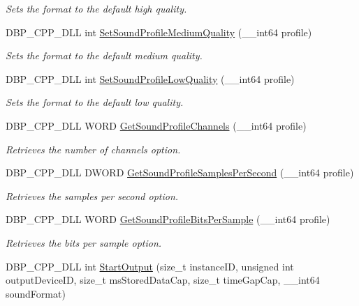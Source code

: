 \begin{DoxyCompactItemize}
\begin{DoxyCompactList}\small\item\em Sets the format to the default high quality. \item\end{DoxyCompactList}\item 
DBP\_\-CPP\_\-DLL int \hyperlink{namespacemn_sound_a3551bc3ffd8d9b55fd7e2edbfc83652a}{SetSoundProfileMediumQuality} (\_\-\_\-int64 profile)
\begin{DoxyCompactList}\small\item\em Sets the format to the default medium quality. \item\end{DoxyCompactList}\item 
DBP\_\-CPP\_\-DLL int \hyperlink{namespacemn_sound_a5da025d9b5b6b76b0b2c2d4db16d3825}{SetSoundProfileLowQuality} (\_\-\_\-int64 profile)
\begin{DoxyCompactList}\small\item\em Sets the format to the default low quality. \item\end{DoxyCompactList}\item 
DBP\_\-CPP\_\-DLL WORD \hyperlink{namespacemn_sound_af3eb9a729f081bdeb8e5d47159eedd7e}{GetSoundProfileChannels} (\_\-\_\-int64 profile)
\begin{DoxyCompactList}\small\item\em Retrieves the number of channels option. \item\end{DoxyCompactList}\item 
DBP\_\-CPP\_\-DLL DWORD \hyperlink{namespacemn_sound_a93520b3cb286768fccbd7ba83d41447d}{GetSoundProfileSamplesPerSecond} (\_\-\_\-int64 profile)
\begin{DoxyCompactList}\small\item\em Retrieves the samples per second option. \item\end{DoxyCompactList}\item 
DBP\_\-CPP\_\-DLL WORD \hyperlink{namespacemn_sound_aebdf926e327e83fdeff4b0eb2993059a}{GetSoundProfileBitsPerSample} (\_\-\_\-int64 profile)
\begin{DoxyCompactList}\small\item\em Retrieves the bits per sample option. \item\end{DoxyCompactList}\item 
DBP\_\-CPP\_\-DLL int \hyperlink{namespacemn_sound_aaf9dc82f488af0bab8d2bd73f252756d}{StartOutput} (size\_\-t instanceID, unsigned int outputDeviceID, size\_\-t msStoredDataCap, size\_\-t timeGapCap, \_\-\_\-int64 soundFormat)

\end{DoxyCompactItemize}
